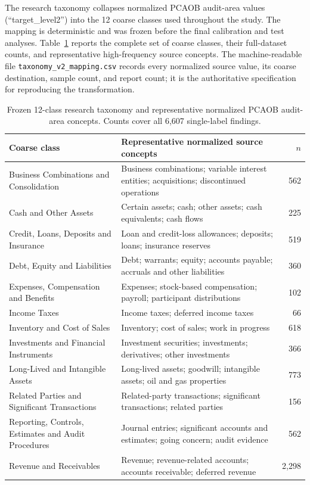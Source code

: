 \documentclass[11pt]{article}
\begin{document}
The research taxonomy collapses normalized PCAOB audit-area values
(``target\_level2'') into the 12 coarse classes used throughout the study. The
mapping is deterministic and was frozen before the final calibration and test
analyses. Table~\ref{tab:taxonomy-summary} reports the complete set of coarse
classes, their full-dataset counts, and representative high-frequency source
concepts. The machine-readable file \texttt{taxonomy\_v2\_mapping.csv} records
every normalized source value, its coarse destination, sample count, and report
count; it is the authoritative specification for reproducing the transformation.

\begin{table}[p]
  \centering
  \small
  \caption{Frozen 12-class research taxonomy and representative normalized
  PCAOB audit-area concepts. Counts cover all 6,607 single-label findings.}
  \label{tab:taxonomy-summary}
  \begin{tabular}{p{}p{}r}
    \toprule
    Coarse class & Representative normalized source concepts & $n$ \\
    \midrule
    Business Combinations and Consolidation & Business combinations; variable interest entities; acquisitions; discontinued operations & 562 \\
    Cash and Other Assets & Certain assets; cash; other assets; cash equivalents; cash flows & 225 \\
    Credit, Loans, Deposits and Insurance & Loan and credit-loss allowances; deposits; loans; insurance reserves & 519 \\
    Debt, Equity and Liabilities & Debt; warrants; equity; accounts payable; accruals and other liabilities & 360 \\
    Expenses, Compensation and Benefits & Expenses; stock-based compensation; payroll; participant distributions & 102 \\
    Income Taxes & Income taxes; deferred income taxes & 66 \\
    Inventory and Cost of Sales & Inventory; cost of sales; work in progress & 618 \\
    Investments and Financial Instruments & Investment securities; investments; derivatives; other investments & 366 \\
    Long-Lived and Intangible Assets & Long-lived assets; goodwill; intangible assets; oil and gas properties & 773 \\
    Related Parties and Significant Transactions & Related-party transactions; significant transactions; related parties & 156 \\
    Reporting, Controls, Estimates and Audit Procedures & Journal entries; significant accounts and estimates; going concern; audit evidence & 562 \\
    Revenue and Receivables & Revenue; revenue-related accounts; accounts receivable; deferred revenue & 2,298 \\
    \bottomrule
  \end{tabular}
\end{table}
\end{document}
